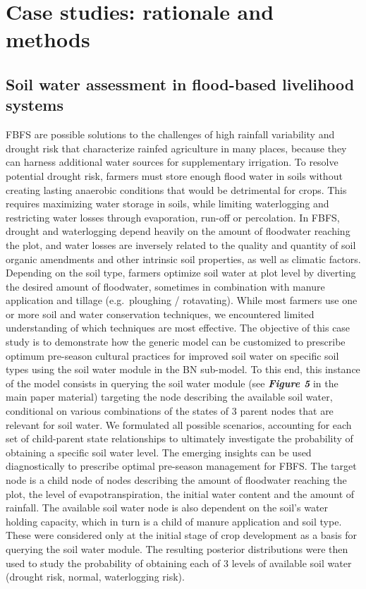 \documentclass[]{elsarticle} %
\begin{document}
\hypertarget{refs5}{%
\section{Case studies: rationale and methods}\label{refs5}}

\hypertarget{refs51}{%
\subsection{Soil water assessment in flood-based livelihood systems}\label{refs51}}

FBFS are possible solutions to the challenges of high rainfall variability and drought risk that characterize rainfed agriculture in many places, because they can harness additional water sources for supplementary irrigation. To resolve potential drought risk, farmers must store enough flood water in soils without creating lasting anaerobic conditions that would be detrimental for crops. This requires maximizing water storage in soils, while limiting waterlogging and restricting water losses through evaporation, run-off or percolation. In FBFS, drought and waterlogging depend heavily on the amount of floodwater reaching the plot, and water losses are inversely related to the quality and quantity of soil organic amendments and other intrinsic soil properties, as well as climatic factors. Depending on the soil type, farmers optimize soil water at plot level by diverting the desired amount of floodwater, sometimes in combination with manure application and tillage (e.g.~ploughing / rotavating). While most farmers use one or more soil and water conservation techniques, we encountered limited understanding of which techniques are most effective. The objective of this case study is to demonstrate how the generic model can be customized to prescribe optimum pre-season cultural practices for improved soil water on specific soil types using the soil water module in the BN sub-model. To this end, this instance of the model consists in querying the soil water module (see \textbf{\emph{Figure 5}} in the main paper material) targeting the node describing the available soil water, conditional on various combinations of the states of 3 parent nodes that are relevant for soil water. We formulated all possible scenarios, accounting for each set of child-parent state relationships to ultimately investigate the probability of obtaining a specific soil water level. The emerging insights can be used diagnostically to prescribe optimal pre-season management for FBFS.
The target node is a child node of nodes describing the amount of floodwater reaching the plot, the level of evapotranspiration, the initial water content and the amount of rainfall. The available soil water node is also dependent on the soil's water holding capacity, which in turn is a child of manure application and soil type. These were considered only at the initial stage of crop development as a basis for querying the soil water module. The resulting posterior distributions were then used to study the probability of obtaining each of 3 levels of available soil water (drought risk, normal, waterlogging risk).
\end{document}

